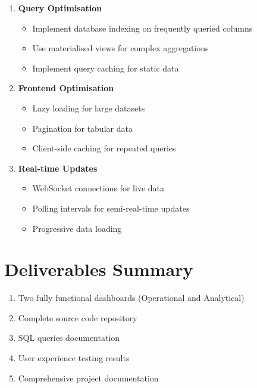 \documentclass[12pt,a4paper]{article}
\begin{document}
\begin{enumerate}
    \item \textbf{Query Optimisation}
    \begin{itemize}
        \item Implement database indexing on frequently queried columns
        \item Use materialised views for complex aggregations
        \item Implement query caching for static data
    \end{itemize}
    
    \item \textbf{Frontend Optimisation}
    \begin{itemize}
        \item Lazy loading for large datasets
        \item Pagination for tabular data
        \item Client-side caching for repeated queries
    \end{itemize}
    
    \item \textbf{Real-time Updates}
    \begin{itemize}
        \item WebSocket connections for live data
        \item Polling intervals for semi-real-time updates
        \item Progressive data loading
    \end{itemize}
\end{enumerate}

\section{Deliverables Summary}

\begin{enumerate}
    \item Two fully functional dashboards (Operational and Analytical)
    \item Complete source code repository
    \item SQL queries documentation
    \item User experience testing results
    \item Comprehensive project documentation
\end{enumerate}
\end{document}
